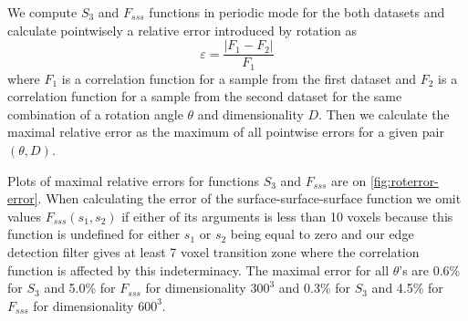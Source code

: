 \documentclass[reprint,amsmath,amssymb,aps,pre,showkeys,showpacs]{revtex4-1}
\begin{document}
We compute $S_3$ and $F_{sss}$ functions in periodic mode for the both datasets
and calculate pointwisely a relative error introduced by rotation as
\begin{equation}
  \varepsilon = \frac{|F_1 - F_2|}{F_1}
  \label{eq:relerr}
\end{equation}
where $F_1$ is a correlation function for a sample from the first dataset and
$F_2$ is a correlation function for a sample from the second dataset for the
same combination of a rotation angle $\theta$ and dimensionality $D$. Then we
calculate the maximal relative error as the maximum of all pointwise errors for
a given pair $(\theta, D)$.

Plots of maximal relative errors for functions $S_3$ and $F_{sss}$ are on
\cref{fig:roterror-error}. When calculating the error of the
surface-surface-surface function we omit values $F_{sss}(s_1, s_2)$ if either of
its arguments is less than 10 voxels because this function is undefined for
either $s_1$ or $s_2$ being equal to zero and our edge detection filter gives at
least 7 voxel transition zone where the correlation function is affected by this
indeterminacy. The maximal error for all $\theta$'s are 0.6\% for $S_3$ and 5.0\%
for $F_{sss}$ for dimensionality $300^3$ and 0.3\% for $S_3$ and 4.5\% for
$F_{sss}$ for dimensionality $600^3$.
\end{document}
